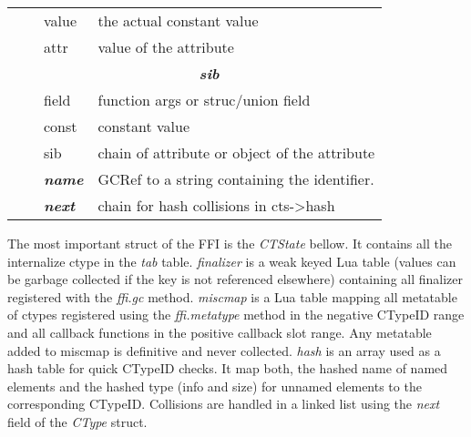 \begin{table}[p]
\begin{tabular}{ll|l|l|}
                             &                & value                  & the actual constant value                          \\
                             &                & attr                   & value of the attribute                             \\ \cline{3-4}
                             &                & \multicolumn{2}{c|}{\textit{\textbf{sib}}}                                  \\ \cline{3-4}
                             &                & field                  & function args or struc/union field                 \\
                             &                & const                  & constant value                                     \\
                             &                & sib                    & chain of attribute or object of the attribute      \\ \cline{3-4}
                             &                & \textit{\textbf{name}} & GCRef to a string containing the identifier.       \\ \cline{3-4}
                             &                & \textit{\textbf{next}} & chain for hash collisions in cts-\textgreater hash \\ \cline{3-4}
\end{tabular}
\end{table}

The most important struct of the FFI is the \emph{CTState} bellow. It contains
all the internalize ctype in the \emph{tab} table. \emph{finalizer} is a weak
keyed Lua table (values can be garbage collected if the key is not referenced
elsewhere) containing all finalizer registered with the \emph{ffi.gc} method.
\emph{miscmap} is a Lua table mapping all metatable of ctypes registered using
the \emph{ffi.metatype} method in the negative CTypeID range and all callback
functions in the positive callback slot range. Any metatable added to miscmap is
definitive and never collected. \emph{hash} is an array used as a hash table
for quick CTypeID checks. It map both, the hashed name of named elements and the
hashed type (info and size) for unnamed elements to the corresponding CTypeID.
Collisions are handled in a linked list using the \emph{next} field of the
\emph{CType} struct.


